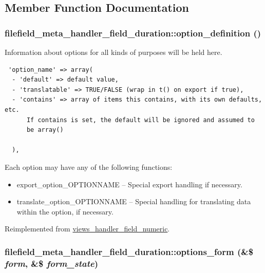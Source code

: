 \subsection{Member Function Documentation}
\hypertarget{classfilefield__meta__handler__field__duration_3bf4ecb0dbaa680516e6e27306771dd4}{
\subsubsection[{option\_\-definition}]{\setlength{\rightskip}{0pt plus 5cm}filefield\_\-meta\_\-handler\_\-field\_\-duration::option\_\-definition ()}}
\label{classfilefield__meta__handler__field__duration_3bf4ecb0dbaa680516e6e27306771dd4}


Information about options for all kinds of purposes will be held here. 

\begin{Code}\begin{verbatim} 'option_name' => array(
  - 'default' => default value,
  - 'translatable' => TRUE/FALSE (wrap in t() on export if true),
  - 'contains' => array of items this contains, with its own defaults, etc.
      If contains is set, the default will be ignored and assumed to
      be array()

  ),
\end{verbatim}
\end{Code}

 Each option may have any of the following functions:\begin{itemize}
\item export\_\-option\_\-OPTIONNAME -- Special export handling if necessary.\item translate\_\-option\_\-OPTIONNAME -- Special handling for translating data within the option, if necessary. \end{itemize}


Reimplemented from \hyperlink{classviews__handler__field__numeric_ab74a55c8b3c564ee995e210a503947b}{views\_\-handler\_\-field\_\-numeric}.\hypertarget{classfilefield__meta__handler__field__duration_4c26d6d5b7dad8dce469f82d9bc9c70c}{
\subsubsection[{options\_\-form}]{\setlength{\rightskip}{0pt plus 5cm}filefield\_\-meta\_\-handler\_\-field\_\-duration::options\_\-form (\&\$ {\em form}, \/  \&\$ {\em form\_\-state})}}
\label{classfilefield__meta__handler__field__duration_4c26d6d5b7dad8dce469f82d9bc9c70c}


